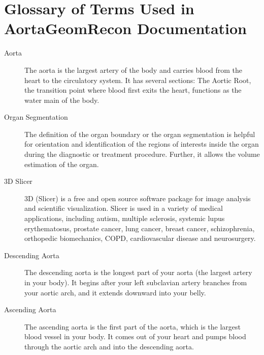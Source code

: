 \documentclass[letterpaper,10pt,english]{sphinxmanual}
\begin{document}
\section{Glossary of Terms Used in AortaGeomRecon Documentation}
\label{\detokenize{glossary:glossary-of-terms-used-in-aortageomrecon-documentation}}\label{\detokenize{glossary::doc}}\begin{description}
\item[{Aorta\label{\detokenize{glossary:term-Aorta}}}] \leavevmode
\sphinxAtStartPar
The aorta is the largest artery of the body and carries blood from the heart to the circulatory system. It has several sections: The Aortic Root, the transition point where blood first exits the heart, functions as the water main of the body.

\item[{Organ Segmentation\label{\detokenize{glossary:term-Organ-Segmentation}}}] \leavevmode
\sphinxAtStartPar
The definition of the organ boundary or the organ segmentation is helpful for orientation and identification of the regions of interests inside the organ during the diagnostic or treatment procedure. Further, it allows the volume estimation of the organ.

\item[{3D Slicer\label{\detokenize{glossary:term-3D-Slicer}}}] \leavevmode
\sphinxAtStartPar
3D  (Slicer) is a free and open source software package for image analysis and scientific visualization. Slicer is used in a variety of medical applications, including autism, multiple sclerosis, systemic lupus erythematosus, prostate cancer, lung cancer, breast cancer, schizophrenia, orthopedic biomechanics, COPD, cardiovascular disease and neurosurgery.

\item[{Descending Aorta\label{\detokenize{glossary:term-Descending-Aorta}}}] \leavevmode
\sphinxAtStartPar
The descending aorta is the longest part of your aorta (the largest artery in your body). It begins after your left subclavian artery branches from your aortic arch, and it extends downward into your belly.

\item[{Ascending Aorta\label{\detokenize{glossary:term-Ascending-Aorta}}}] \leavevmode
\sphinxAtStartPar
The ascending aorta is the first part of the aorta, which is the largest blood vessel in your body. It comes out of your heart and pumps blood through the aortic arch and into the descending aorta.


\end{description}
\end{document}
